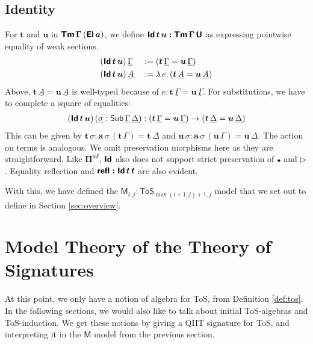 \documentclass[sigplan,review,anonymous]{acmart}\settopmatter{printfolios=true,printccs=false,printacmref=false}
\newcommand{\ToS}{\mathsf{ToS}}
\newcommand{\ext}{\triangleright}
\newcommand{\emptycon}{\scaleobj{.75}\bullet}
\newcommand{\Piinf}{\Pi^{\mathsf{inf}}}
\newcommand{\bTm}{\boldsymbol{\Tm}}
\newcommand{\bGamma}{\boldsymbol{\Gamma}}
\newcommand{\bt}{\boldsymbol{t}}
\newcommand{\bu}{\boldsymbol{u}}
\newcommand{\ba}{\boldsymbol{a}}
\newcommand{\bU}{\boldsymbol{\U}}
\newcommand{\bEl}{\boldsymbol{\El}}
\newcommand{\bPiinf}{\boldsymbol{\Piinf}}
\newcommand{\bId}{\boldsymbol{\Id}}
\newcommand{\bM}{\boldsymbol{\mathsf{M}}}
\newcommand{\ul}[1]{\underline{#1}}
\newcommand{\ulGamma}{\ul{\Gamma}}
\newcommand{\ulDelta}{\ul{\Delta}}
\newcommand{\ulsigma}{\ul{\sigma}}
\newcommand{\ulA}{\ul{A}}
\begin{document}
\subsection{Identity}
For $\bt$ and $\bu$ in $\bTm\,\bGamma\,(\bEl\,\ba)$, we define $\bId\,\bt\,\bu
\boldsymbol{:} \bTm\,\bGamma\,\bU$ as expressing pointwise equality of weak
sections.
\begin{alignat*}{3}
& (\bId\,\bt\,\bu)\,\ulGamma &&:= (\bt\,\ulGamma = \bu\,\ulGamma)\\
& (\bId\,\bt\,\bu)\,\ulA     && := \lambda\,e.\, (\bt\,\ulA = \bu\,\ulA)
\end{alignat*}
Above, $\bt\,\ulA = \bu\,\ulA$ is well-typed because of $e :
\bt\,\ulGamma = \bu\,\ulGamma$. For substitutions, we have to complete a square
of equalities:
\begin{alignat*}{3}
  (\bId\,\bt\,\bu)\,(\ulsigma : \Sub\,\ulGamma\,\ulDelta) : (\bt\,\ulGamma = \bu\,\ulGamma) \ra
       (\bt\,\ulDelta = \bu\,\ulDelta)
\end{alignat*}
This can be given by $\bt\,\ulsigma : \ba\,\ulsigma\,(\bt\,\ulGamma) =
\bt\,\ulDelta$ and $\bu\,\ulsigma : \ba\,\ulsigma\,(\bu\,\ulGamma) =
\bu\,\ulDelta$. The action on terms is analogous. We omit preservation morphisms
here as they are straightforward. Like $\bPiinf$, $\bId$ also does not support
strict preservation of $\emptycon$ and $\ext$. Equality reflection and $\boldsymbol{\refl :}
\bId\,\bt\,\bt$ are also evident.

With this, we have defined the $\bM_{i,j} : \ToS_{\max(i+1,j)+1, j}$ model that
we set out to define in Section \ref{sec:overview}.

\section{Model Theory of the Theory of Signatures}
\label{sec:tossig}

At this point, we only have a notion of algebra for ToS, from Definition
\ref{def:tos}. In the following sections, we would also like to talk about
initial ToS-algebras and ToS-induction. We get these notions by giving a QIIT
signature for ToS, and interpreting it in the $\bM$ model from the previous
section.
\end{document}
